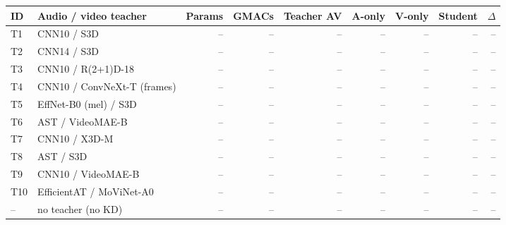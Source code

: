 \begin{tabular}{llrrrrrrr}
\toprule
ID & Audio / video teacher & Params & GMACs & Teacher AV & A-only & V-only & Student & $\Delta$ \\
\midrule
T1 & CNN10 / S3D & -- & -- & -- & -- & -- & -- & -- \\
T2 & CNN14 / S3D & -- & -- & -- & -- & -- & -- & -- \\
T3 & CNN10 / R(2+1)D-18 & -- & -- & -- & -- & -- & -- & -- \\
T4 & CNN10 / ConvNeXt-T (frames) & -- & -- & -- & -- & -- & -- & -- \\
T5 & EffNet-B0 (mel) / S3D & -- & -- & -- & -- & -- & -- & -- \\
T6 & AST / VideoMAE-B & -- & -- & -- & -- & -- & -- & -- \\
T7 & CNN10 / X3D-M & -- & -- & -- & -- & -- & -- & -- \\
T8 & AST / S3D & -- & -- & -- & -- & -- & -- & -- \\
T9 & CNN10 / VideoMAE-B & -- & -- & -- & -- & -- & -- & -- \\
T10 & EfficientAT / MoViNet-A0 & -- & -- & -- & -- & -- & -- & -- \\
\midrule
-- & no teacher (no KD) & -- & -- & -- & -- & -- & -- & -- \\
\bottomrule
\end{tabular}
